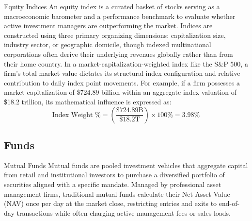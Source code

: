 \documentclass[10pt]{article}
\begin{document}
    \begin{core}{Equity Indices}
      An equity index is a curated basket of stocks serving as a macroeconomic barometer and a performance benchmark to evaluate whether active investment managers are outperforming the market. Indices are constructed using three primary organizing dimensions: capitalization size, industry sector, or geographic domicile, though indexed multinational corporations often derive their underlying revenues globally rather than from their home country. In a market-capitalization-weighted index like the S&P 500, a firm's total market value dictates its structural index configuration and relative contribution to daily index point movements. For example, if a firm possesses a market capitalization of \$724.89 billion within an aggregate index valuation of \$18.2 trillion, its mathematical influence is expressed as:
      $$\text{Index Weight \%} = \left( \frac{\$724.89\text{B}}{\$18.2\text{T}} \right) \times 100\% = 3.98\%$$
    \end{core}


  \subsection{Funds}

    \begin{core}{Mutual Funds}
      Mutual funds are pooled investment vehicles that aggregate capital from retail and institutional investors to purchase a diversified portfolio of securities aligned with a specific mandate. Managed by professional asset management firms, traditional mutual funds calculate their Net Asset Value (NAV) once per day at the market close, restricting entries and exits to end-of-day transactions while often charging active management fees or sales loads.
    \end{core}
\end{document}
